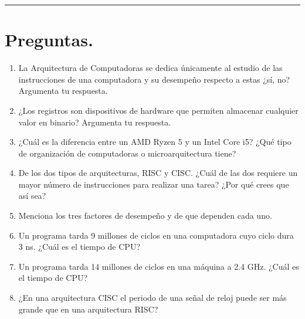 \documentclass[12pt,letterpaper]{article}
\begin{document}
\bigskip
\hrule height 0.1pt
\bigskip

\section*{Preguntas.}

\begin{enumerate}
\item La Arquitectura de Computadoras se dedica únicamente al estudio de las instrucciones de una computadora y su desempeño respecto a estas ¿sí, no? Argumenta tu respuesta.
\bigskip
  
\bigskip

\item ¿Los registros son dispositivos de hardware que permiten almacenar cualquier valor en binario? Argumenta tu respuesta.
  \bigskip
  
  \bigskip
  
\item ¿Cuál es la diferencia entre un AMD Ryzen 5 y un Intel Core i5? ¿Qué tipo de organización de computadoras o microarquitectura tiene?
  \bigskip
  
  \bigskip
  
\item De los dos tipos de arquitecturas, RISC y CISC. ¿Cuál de las dos requiere un mayor número de instrucciones para realizar una tarea? ¿Por qué crees que así sea?
  \bigskip
  
  \bigskip

\item Menciona los tres factores de desempeño y de que dependen cada uno.
  \bigskip
  
  \bigskip

\item Un programa tarda 9 millones de ciclos en una computadora cuyo ciclo dura 3 ns. ¿Cuál es el tiempo de CPU?
  \bigskip
  
  \bigskip
  
\item Un programa tarda 14 millones de ciclos en una máquina a 2.4 GHz. ¿Cuál es el tiempo de CPU?
  \bigskip
  
  \bigskip
  
\item ¿En una arquitectura CISC el periodo de una señal de reloj puede ser más grande que en una arquitectura RISC?
  \bigskip
  

\end{enumerate}
\end{document}
